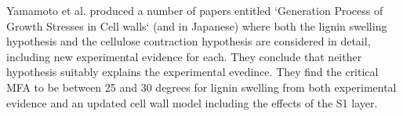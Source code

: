 Yamamoto et al. produced a number of papers entitled `Generation Process of
Growth Stresses in Cell walls` \citep{ISI:A1991FD97000001,ISI:A1992HP18200001,ISI:A1993LM28800002,ISI:A1993LE99600003,ISI:A1995QJ03000001} (and \cite{ISI:A1988R357800002,ISI:A1990EL71100002} in Japanese) where both the lignin swelling
hypothesis and the cellulose contraction hypothesis are considered in detail,
including new experimental evidence for each. They conclude that neither hypothesis suitably explains the experimental evedince. They find the critical MFA to be between 25 and 30 degrees for lignin swelling from both experimental evidence and an updated cell wall model including the effects of the S1 layer. 